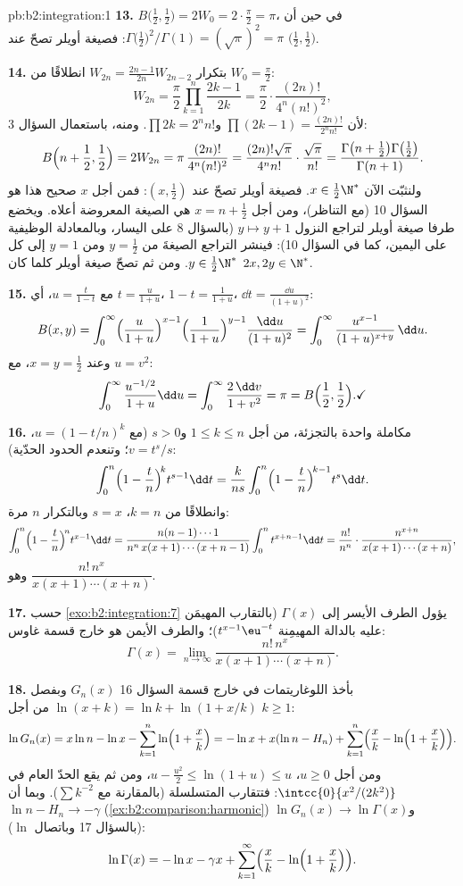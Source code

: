 \begin{solution}{pb:b2:integration:1}
\textbf{13.} $B\bigl(\frac12,\frac12\bigr) = 2W_0 =
2\cdot\frac\pi2 = \pi$، في حين أن
$\Gamma\bigl(\frac12\bigr)^2/\Gamma(1) = (\sqrt\pi)^2 = \pi$:
فصيغة أويلر تصحّ عند $\bigl(\frac12,\frac12\bigr)$.

\textbf{14.} بتكرار $W_{2n} = \frac{2n-1}{2n}W_{2n-2}$ انطلاقًا من
$W_0 = \frac\pi2$:
\[
W_{2n} = \frac\pi2\prod_{k=1}^{n}\frac{2k-1}{2k}
= \frac\pi2\cdot\frac{(2n)!}{4^n(n!)^2},
\]
لأن $\prod(2k-1) = \frac{(2n)!}{2^n n!}$ و$\prod 2k = 2^n
n!$. ومنه، باستعمال السؤال 3:
\[
B\Bigl(n+\frac12, \frac12\Bigr) = 2W_{2n}
= \pi\,\frac{(2n)!}{4^n(n!)^2}
= \frac{(2n)!\sqrt\pi}{4^n n!}\cdot\frac{\sqrt\pi}{n!}
= \frac{\Gamma\bigl(n+\frac12\bigr)\Gamma\bigl(\frac12\bigr)}
{\Gamma(n+1)} .
\]
ولنثبّت الآن $x \in \frac12\N^*$. فصيغة أويلر تصحّ عند $(x,
\frac12)$: فمن أجل $x$ صحيح هذا هو السؤال 10 (مع التناظر)،
ومن أجل $x = n + \frac12$ هي الصيغة المعروضة أعلاه. ويخضع طرفا
صيغة أويلر لتراجع النزول $y \mapsto y + 1$
(بالسؤال 8 على اليسار، وبالمعادلة الوظيفية على اليمين،
كما في السؤال 10): فينشر التراجع الصيغةَ من $y =
\frac12$ ومن $y = 1$ إلى كل $y \in \frac12\N^*$. ومن ثم تصحّ صيغة
أويلر كلما كان $2x, 2y \in \N^*$.

\textbf{15.} مع $u = \frac{t}{1-t}$، أي $t =
\frac{u}{1+u}$، $1 - t = \frac{1}{1+u}$، $\dd t =
\frac{\dd u}{(1+u)^2}$:
\[
B(x,y) = \int_0^\infty
\Bigl(\frac{u}{1+u}\Bigr)^{x-1}
\Bigl(\frac{1}{1+u}\Bigr)^{y-1}
\frac{\dd u}{(1+u)^2}
= \int_0^\infty \frac{u^{x-1}}{(1+u)^{x+y}}\,\dd u .
\]
وعند $x = y = \frac12$، مع $u = v^2$:
\[
\int_0^\infty \frac{u^{-1/2}}{1+u}\dd u
= \int_0^\infty \frac{2\,\dd v}{1+v^2} = \pi
= B\Bigl(\frac12,\frac12\Bigr) . \checkmark
\]

\textbf{16.} مكاملة واحدة بالتجزئة، من أجل $1 \leq k \leq n$
و$s > 0$ (مع $u = (1 - t/n)^k$، $v = t^s/s$؛ وتنعدم الحدود الحدّية):
\[
\int_0^n \Bigl(1-\frac tn\Bigr)^{\!k} t^{s-1}\dd t
= \frac{k}{ns}\int_0^n \Bigl(1-\frac tn\Bigr)^{\!k-1}
t^{s}\dd t .
\]
وانطلاقًا من $k = n$، $s = x$ وبالتكرار $n$ مرة:
\[
\int_0^n \Bigl(1-\frac tn\Bigr)^{\!n} t^{x-1}\dd t
= \frac{n(n-1)\cdots1}{n^n\,x(x+1)\cdots(x+n-1)}
\int_0^n t^{x+n-1}\dd t
= \frac{n!}{n^n}\cdot
\frac{n^{x+n}}{x(x+1)\cdots(x+n)} ,
\]
وهو $\dfrac{n!\,n^x}{x(x+1)\cdots(x+n)}$.

\textbf{17.} حسب \cref{exo:b2:integration:7} يؤول الطرف الأيسر
إلى $\Gamma(x)$ (بالتقارب المهيمَن عليه بالدالة المهيمِنة
$t^{x-1}\eu^{-t}$)؛ والطرف الأيمن هو خارج قسمة غاوس:
\[
\Gamma(x) = \lim_{n\to\infty}
\frac{n!\,n^x}{x(x+1)\cdots(x+n)} .
\]

\textbf{18.} بأخذ اللوغاريتمات في خارج قسمة السؤال 16
$G_n(x)$ وبفصل $\ln(x+k) = \ln k + \ln(1 + x/k)$ من أجل $k
\geq 1$:
\[
\ln G_n(x) = x\ln n - \ln x - \sum_{k=1}^n
\ln\Bigl(1+\frac xk\Bigr)
= -\ln x + x(\ln n - H_n)
+ \sum_{k=1}^n\Bigl(\frac xk -
\ln\Bigl(1+\frac xk\Bigr)\Bigr).
\]
ومن أجل $u \geq 0$، $u - \frac{u^2}2 \leq \ln(1+u) \leq u$، ومن ثم يقع
الحدّ العام في $\intcc{0}{x^2/(2k^2)}$: فتتقارب المتسلسلة
(بالمقارنة مع $\sum k^{-2}$). وبما أن $\ln n - H_n
\to -\gamma$ (\cref{ex:b2:comparison:harmonic}) و$\ln G_n(x)
\to \ln\Gamma(x)$ (بالسؤال 17 وباتصال $\ln$):
\[
\ln\Gamma(x) = -\ln x - \gamma x
+ \sum_{k=1}^\infty\Bigl(\frac xk -
\ln\Bigl(1+\frac xk\Bigr)\Bigr) .
\]


\end{solution}
